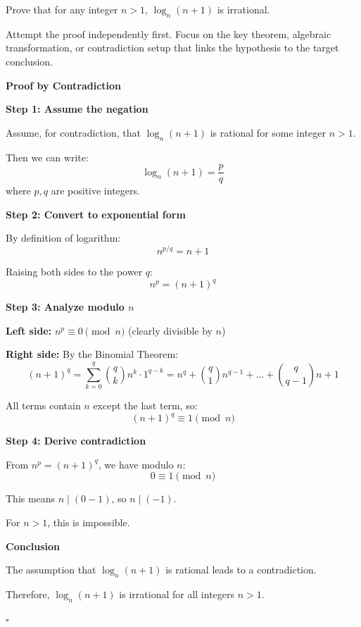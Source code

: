 
\begin{problem}
Prove that for any integer $n > 1$, $\log_n(n+1)$ is irrational.
\end{problem}

\begin{hint}
Attempt the proof independently first. Focus on the key theorem, algebraic transformation, or contradiction setup that links the hypothesis to the target conclusion.
\end{hint}

\begin{solution}
\textbf{Proof by Contradiction}

\textbf{Step 1: Assume the negation}

Assume, for contradiction, that $\log_n(n+1)$ is rational for some integer $n > 1$.

Then we can write:
\[ \log_n(n+1) = \frac{p}{q} \]
where $p, q$ are positive integers.

\textbf{Step 2: Convert to exponential form}

By definition of logarithm:
\[ n^{p/q} = n+1 \]

Raising both sides to the power $q$:
\[ n^p = (n+1)^q \]

\textbf{Step 3: Analyze modulo $n$}

\textbf{Left side:} $n^p \equiv 0 \pmod{n}$ (clearly divisible by $n$)

\textbf{Right side:} By the Binomial Theorem:
\[ (n+1)^q = \sum_{k=0}^{q} \binom{q}{k} n^k \cdot 1^{q-k} = n^q + \binom{q}{1}n^{q-1} + \ldots + \binom{q}{q-1}n + 1 \]

All terms contain $n$ except the last term, so:
\[ (n+1)^q \equiv 1 \pmod{n} \]

\textbf{Step 4: Derive contradiction}

From $n^p = (n+1)^q$, we have modulo $n$:
\[ 0 \equiv 1 \pmod{n} \]

This means $n \mid (0-1)$, so $n \mid (-1)$.

For $n > 1$, this is impossible.

\textbf{Conclusion}

The assumption that $\log_n(n+1)$ is rational leads to a contradiction.

Therefore, $\log_n(n+1)$ is irrational for all integers $n > 1$.

\hfill $\square$
\end{solution}

